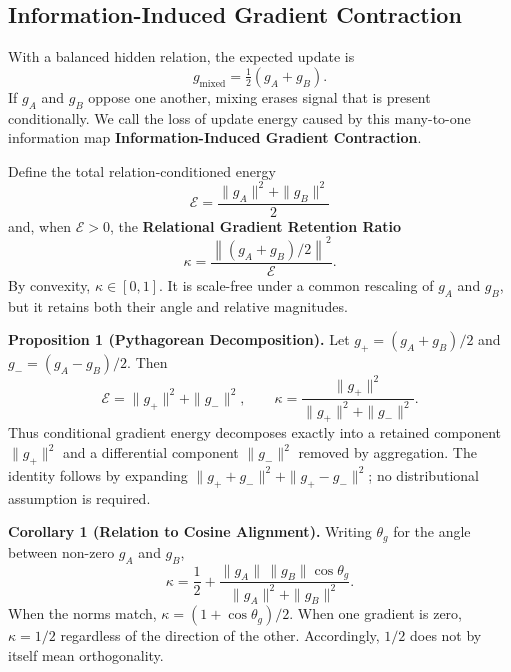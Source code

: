 \documentclass[letterpaper]{article}
\begin{document}
\subsection{Information-Induced Gradient Contraction}

With a balanced hidden relation, the expected update is
\begin{equation}
g_{\mathrm{mixed}}=\tfrac{1}{2}(g_A+g_B).
\label{eq:mixed}
\end{equation}
If $g_A$ and $g_B$ oppose one another, mixing erases signal that is present conditionally.
We call the loss of update energy caused by this many-to-one information map \textbf{Information-Induced Gradient Contraction}.

Define the total relation-conditioned energy
\begin{equation}
\mathcal{E}=\frac{\|g_A\|^2+\|g_B\|^2}{2}
\label{eq:energy}
\end{equation}
and, when $\mathcal{E}>0$, the \textbf{Relational Gradient Retention Ratio}
\begin{equation}
\kappa=
\frac{\left\|(g_A+g_B)/2\right\|^2}{\mathcal{E}}.
\label{eq:kappa}
\end{equation}
By convexity, $\kappa\in[0,1]$.
It is scale-free under a common rescaling of $g_A$ and $g_B$, but it retains both their angle and relative magnitudes.

\medskip
\noindent\textbf{Proposition 1 (Pythagorean Decomposition).}
Let $g_+=(g_A+g_B)/2$ and $g_-=(g_A-g_B)/2$.
Then
\begin{equation}
\mathcal{E}=\|g_+\|^2+\|g_-\|^2,
\qquad
\kappa=\frac{\|g_+\|^2}{\|g_+\|^2+\|g_-\|^2}.
\label{eq:pythagorean}
\end{equation}
Thus conditional gradient energy decomposes exactly into a retained component $\|g_+\|^2$ and a differential component $\|g_-\|^2$ removed by aggregation.
The identity follows by expanding $\|g_++g_-\|^2+\|g_+-g_-\|^2$; no distributional assumption is required.

\medskip
\noindent\textbf{Corollary 1 (Relation to Cosine Alignment).}
Writing $\theta_g$ for the angle between non-zero $g_A$ and $g_B$,
\begin{equation}
\kappa=
\frac{1}{2}
+
\frac{\|g_A\|\,\|g_B\|\cos\theta_g}
{\|g_A\|^2+\|g_B\|^2}.
\label{eq:cosine}
\end{equation}
When the norms match, $\kappa=(1+\cos\theta_g)/2$.
When one gradient is zero, $\kappa=1/2$ regardless of the direction of the other.
Accordingly, $1/2$ does not by itself mean orthogonality.
\end{document}
